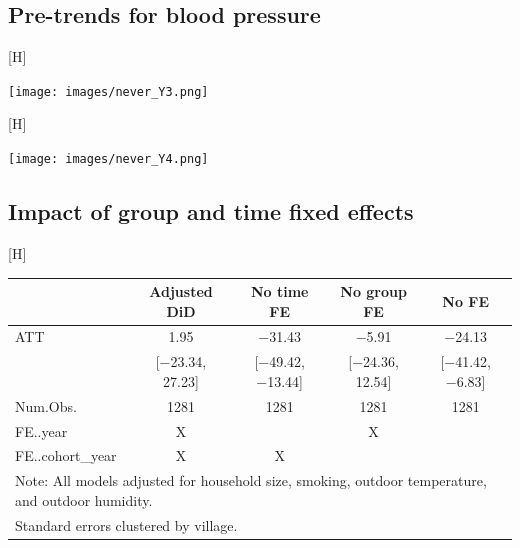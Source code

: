 \documentclass[
  letterpaper,
  DIV=11,
  numbers=noendperiod]{scrartcl}
\makeatletter
\renewenvironment{table}%
   {\renewcommand\familydefault\sfdefault
    \@float{table}}
   {\end@float}
\renewenvironment{figure}%
   {\renewcommand\familydefault\sfdefault
    \@float{figure}}
   {\end@float}
\makeatother
\begin{document}
\newpage

\hypertarget{pre-trends-for-blood-pressure}{%
\subsection{Pre-trends for blood
pressure}\label{pre-trends-for-blood-pressure}}

\begin{figure}[H]

{\centering \texttt{[image: images/never\_Y3.png]}

}

\caption{\label{fig-afig-pt3}Comparison of pre-interventions trends in
blood pressure between waves 1 and 2 for never treated and villages
later treated in wave 3}

\end{figure}

\begin{figure}[H]

{\centering \texttt{[image: images/never\_Y4.png]}

}

\caption{\label{fig-afig-pt4}Comparison of pre-interventions trends in
blood pressure between waves 1 and 2 for never treated and villages
later treated in wave 4}

\end{figure}

\newpage

\newpage

\hypertarget{impact-of-group-and-time-fixed-effects}{%
\subsection{Impact of group and time fixed
effects}\label{impact-of-group-and-time-fixed-effects}}

\hypertarget{tbl-a-fe}{}
\begin{table}[H]
\caption{\label{tbl-a-fe}Effects of the CBHP policy on personal exposure (\(\mu g / m^{3}\)) with
variations in fixed effects for treatment group and time. }\tabularnewline

\centering\centering
\begin{tabular}[t]{lcccc}
\toprule
  & Adjusted DiD & No time FE & No group FE & No FE\\
\midrule
ATT & \num{1.95} & \num{-31.43} & \num{-5.91} & \num{-24.13}\\
 & {}[\num{-23.34}, \num{27.23}] & {}[\num{-49.42}, \num{-13.44}] & {}[\num{-24.36}, \num{12.54}] & {}[\num{-41.42}, \num{-6.83}]\\
\midrule
Num.Obs. & \num{1281} & \num{1281} & \num{1281} & \num{1281}\\
FE..year & X &  & X & \\
FE..cohort\_year & X & X &  & \\
\bottomrule
\multicolumn{5}{l}{\rule{0pt}{1em}Note: All models adjusted for household size, smoking, outdoor temperature, and outdoor humidity.}\\
\multicolumn{5}{l}{\rule{0pt}{1em}Standard errors clustered by village.}\\
\end{tabular}
\end{table}
\end{document}
